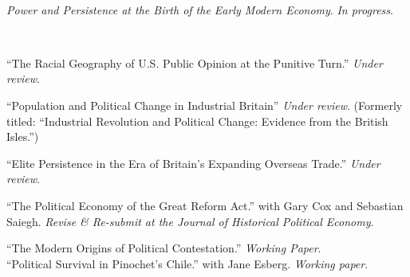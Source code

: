 \documentclass[11pt]{article}
\begin{document}
\vspace{.3in}
\begin{minipage}[t]{.21\textwidth}
	 \\
\end{minipage}
\begin{minipage}[t]{.79\textwidth}
		\emph{Power and Persistence at the Birth of the Early Modern Economy}.  \emph{In progress}.
\end{minipage}


\vspace{.3in}
\begin{minipage}[t]{.21\textwidth}
	 \\
\end{minipage}
\begin{minipage}[t]{.79\textwidth}
	``The Racial Geography of U.S. Public Opinion at the Punitive Turn.'' \emph{Under review}.\\
	\vspace{-.05in}

	``Population and Political Change in Industrial Britain'' \emph{Under review}. (Formerly titled: ``Industrial Revolution and Political Change: Evidence from the British Isles.'')\\
	\vspace{-.05in}

  ``Elite Persistence in the Era of Britain's Expanding Overseas Trade.'' \emph{Under review}. \\
  \vspace{-.05in}

	``The Political Economy of the Great Reform Act.'' with Gary Cox and Sebastian Saiegh. \emph{Revise \& Re-submit at the Journal of Historical Political Economy}.\\
  \vspace{-.05in}

	``The Modern Origins of Political Contestation.'' \emph{Working Paper}. \\

  ``Political Survival in Pinochet's Chile.'' with Jane Esberg. \emph{Working paper}.\\
  \vspace{-.05in}

\end{minipage}
\end{document}

